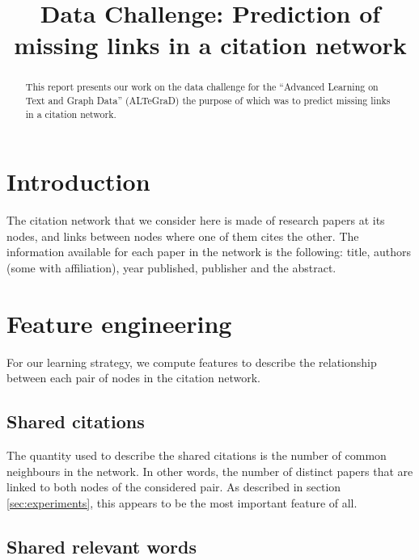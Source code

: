 \documentclass{article}
\title{Data Challenge: Prediction of missing links in a citation network}
\begin{document}
\ninept

\maketitle

\begin{abstract}
This report presents our work on the data challenge for the \enquote{Advanced Learning on Text and Graph Data} (ALTeGraD) the purpose of which was to predict missing links in a citation network.
\end{abstract}


\section{Introduction}

The citation network that we consider here is made of research papers at its nodes, and links between nodes where one of them cites the other.
The information available for each paper in the network is the following: title, authors (some with affiliation), year published, publisher and the abstract.

\section{Feature engineering}

For our learning strategy, we compute features to describe the relationship between each pair of nodes in the citation network.

\subsection{Shared citations}

The quantity used to describe the shared citations is the number of common neighbours in the network. In other words, the number of distinct papers that are linked to both nodes of the considered pair.
As described in section \ref{sec:experiments}, this appears to be the most important feature of all.

\subsection{Shared relevant words}
\end{document}
